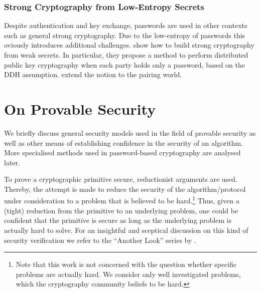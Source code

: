 \subsubsection{Strong Cryptography from Low-Entropy Secrets}
Despite authentication and key exchange, passwords are used in other contexts such as general strong cryptography.
Due to the low-entropy of passwords this oviously introduces additional challenges.
\citet{AbdallaBCP09} show how to build strong cryptography from weak secrets.
In particular, they propose a method to perform distributed public key cryptography when each party holds only a password, based on the \acl{DDH} assumption.
\citet{BoyenCFP10} extend the notion to the pairing world.



\section{On Provable Security}
We briefly discuss general security models used in the field of provable security as well as other means of establishing confidence in the security of an algorithm.
More specialised methods used in password-based cryptography are analysed later.

To prove a cryptographic primitive secure, reductionist arguments are used.
Thereby, the attempt is made to reduce the security of the algorithm/protocol under consideration to a problem that is believed to be hard.\footnote{Note that this work is not concerned with the question whether specific problems are actually hard. We consider only well investigated problems, which the cryptography community beliefs to be hard.}
Thus, given a (tight) reduction from the primitive to an underlying problem, one could be confident that the primitive is secure as long as the underlying problem is actually hard to solve.
For an insightful and sceptical discussion on this kind of security verification we refer to the ``Another Look'' series by \citet{AnotherLook}.

